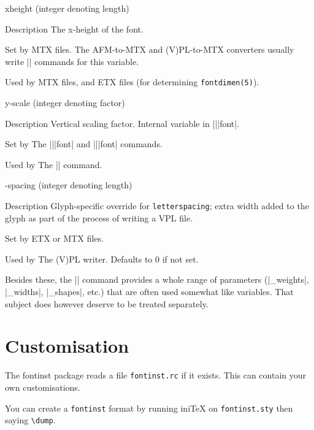 \documentclass[a4paper]{ltxguide}
\newenvironment{smalldes}{%
   \list{}{%
      \setlength\labelwidth{0pt}%
      \setlength\itemindent{-\leftmargin}%
      \setlength\listparindent{1em}%
      \setlength\parsep{0pt}%
      \setlength\itemsep{0pt plus 1pt}%
      \setlength\topsep{\itemsep}%
      \let\makelabel\descriptionlabel
   }%
}{\endlist}
\newcommand*{\meta}{\m}
\newcommand*{\setpackagename}[1]{\textsf{#1}}
\newcommand{\fontinst}{\setpackagename{font\-inst}\xspace}
\begin{document}
\begin{list}{}{%
   \setlength{}%
   \setlength\itemindent{-\leftmargin}%
   \setlength\parsep{0pt}
   \def\makelabel#1{\hspace\labelsep \normalfont\ttfamily #1}%
}
  \item[xheight] (integer denoting length)
    \begin{smalldes}
      \item[Description] The x-height of the font.
      \item[Set by] MTX files. The AFM-to-MTX and (V)PL-to-MTX 
        converters usually write |\setint| commands for this variable.
      \item[Used by] MTX files, and ETX files (for determining 
        \texttt{fontdimen(5)}).
    \end{smalldes}
  \item[y-scale] (integer denoting factor)
    \begin{smalldes}
      \item[Description] Vertical scaling factor. 
        Internal variable in |\transform|\-|font|.
      \item[Set by] The |\yscale|\-|font| and |\scale|\-|font| commands.
      \item[Used by] The |\mtxtomtx| command.
    \end{smalldes}
  \item[\meta{\rmfamily glyph}-spacing] (integer denoting length)
    \begin{smalldes}
      \item[Description] Glyph-specific override for 
        \texttt{letterspacing}; extra width added to the glyph 
        \meta{glyph} as part of the process of writing a VPL 
        file.
      \item[Set by] ETX or MTX files.
      \item[Used by] The (V)PL writer. Defaults to $0$ if not set.
    \end{smalldes}
\end{list}
Besides these, the |\latinfamily| command provides a whole range of 
parameters (|\latin_weights|, |\latin_widths|, |\latin_shapes|, etc.) 
that are often used somewhat like variables. That subject 
does however deserve to be treated separately.



\section{Customisation}

The \fontinst package reads a file \texttt{fontinst.rc} if it
exists.  This can contain your own customisations.

You can create a \texttt{fontinst} format by running ini\TeX{} on
\texttt{fontinst.sty} then saying \verb|\dump|.
\end{document}
